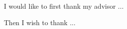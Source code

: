   \noindent I would like to first thank my advisor ...
  \bigskip

  \noindent Then I wish to thank ...
